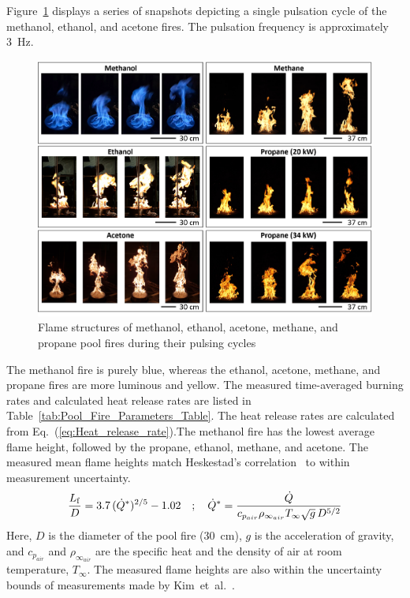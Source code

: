 \documentclass[12pt]{article}
\begin{document}
Figure~\ref{fig:Flame_Structure} displays a series of snapshots depicting a single pulsation cycle of the methanol, ethanol, and acetone fires. The pulsation frequency is approximately 3~Hz.
\begin{figure}
	\centering
\includegraphics[width=\textwidth,keepaspectratio]{Flame_Structure.png}
	\caption[Photographs of pool fires during their pulsing cycles]{Flame structures of methanol, ethanol, acetone, methane, and propane pool fires during their pulsing cycles}
	\label{fig:Flame_Structure}
\end{figure}
The methanol fire is purely blue, whereas the ethanol, acetone, methane, and propane fires are more luminous and yellow. The measured time-averaged burning rates and calculated heat release rates are listed in Table~\ref{tab:Pool_Fire_Parameters_Table}. The heat release rates are calculated from Eq.~(\ref{eq:Heat_release_rate}).The methanol fire has the lowest average flame height, followed by the propane, ethanol, methane, and acetone. The measured mean flame heights match Heskestad’s correlation~\cite{Heskestad1983} to within measurement uncertainty.
\begin{equation}
\frac{L_{\rm f}}{D} = 3.7 \, (\dot{Q}^*)^{2/5} - 1.02 \quad ; \quad \dot{Q}^*=\frac{\dot{Q}}{c_{p_{air}} \rho_{\infty_{air}} T_\infty \sqrt{g} \, D^{5/2}}
\end{equation}
Here, $D$ is the diameter of the pool fire (30~cm), $g$ is the acceleration of gravity, and ${c_{p_{air}}}$ and $\rho_{\infty_{air}}$ are the specific heat and the density of air at room temperature, $T_\infty$. The measured flame heights are also within the uncertainty bounds of measurements made by Kim~et~al.~\cite{Kim2019}.
\end{document}
